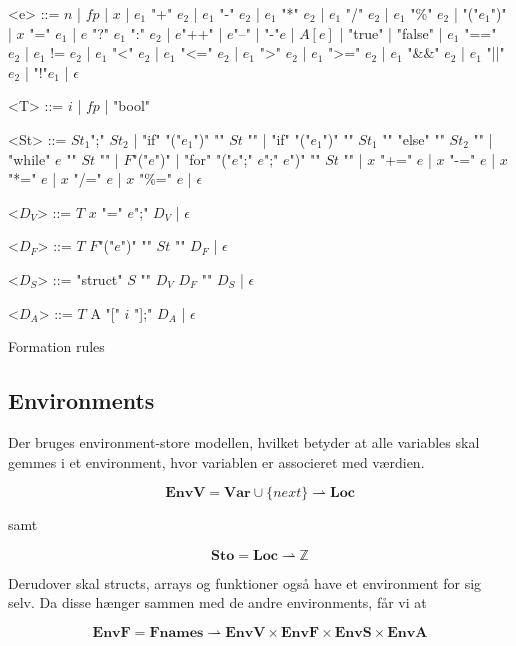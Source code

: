 \begin{Grammar}
 \begin{grammar}

 <e> ::= $n$ | $fp$ | $x$  | $e_1$ "+" $e_2$ | $e_1$ "-" $e_2$ | $e_1$ "*" $e_2$ | $e_1$ "/" $e_2$ | $e_1$ "\%" $e_2$ | "("$e_1$")" | $x$ "=" $e_1$ | $e$ "?" $e_1$ ":" $e_2$ | $e$"++" | $e$"--" | "-"$e$ | $A[e]$ | "true" | "false" | $e_1$ "==" $e_2$ | $e_1$ != $e_2$ | $e_1$ "<" $e_2$ | $e_1$ "<=" $e_2$ | $e_1$ ">" $e_2$ | $e_1$ ">=" $e_2$ | $e_1$ "\&\&" $e_2$ | $e_1$ "||" $e_2$ | "!"$e_1$ | $\epsilon$

 <T> ::= $i$ | $fp$ | "bool"
 
 <St> ::= $St_1$";" $St_2$ | "if" "("$e_1$")" "{" $St$ "}" | "if" "("$e_1$")" "{" $St_1$ "}" "else" "{" $St_2$ "}" | "while" $e$ "{" $St$ "}" | $F$"("$e$")" | "for" "("$e$";" $e$";" $e$")" "{" $St$ "}" | $x$ "+=" $e$ | $x$ "-=" $e$ | $x$ "*=" $e$ | $x$ "/=" $e$ | $x$ "\%=" $e$ | $\epsilon$
 
 <$D_V$> ::= $T$ $x$ "=" $e$";" $D_V$ | $\epsilon$
 
 <$D_F$> ::= $T$ $F$"("$e$")" "{" $St$ "}" $D_F$ | $\epsilon$
 
 <$D_S$> ::= "struct" $S$ "{" $D_V$ $D_F$ "}" $D_S$ | $\epsilon$
 
 <$D_A$> ::= $T$ A "[" $i$ "];" $D_A$ | $\epsilon$

  
 \end{grammar}
 \caption{Formation rules}\label{gra:formationrules}
\end{Grammar}

\subsection{Environments}

Der bruges environment-store modellen, hvilket betyder at alle variables skal gemmes i et environment, hvor variablen er associeret med værdien.

$$ \textbf{EnvV} = \textbf{Var} \cup \{next\} \rightharpoonup \textbf{Loc} $$

\noindent samt

$$ \textbf{Sto} = \textbf{Loc} \rightharpoonup \mathds{Z} $$

\noindent Derudover skal structs, arrays og funktioner også have et environment for sig selv. Da disse hænger sammen med de andre environments, får vi at

$$ \textbf{EnvF} = \textbf{Fnames} \rightharpoonup \textbf{EnvV} \times \textbf{EnvF} \times \textbf{EnvS} \times \textbf{EnvA} $$

